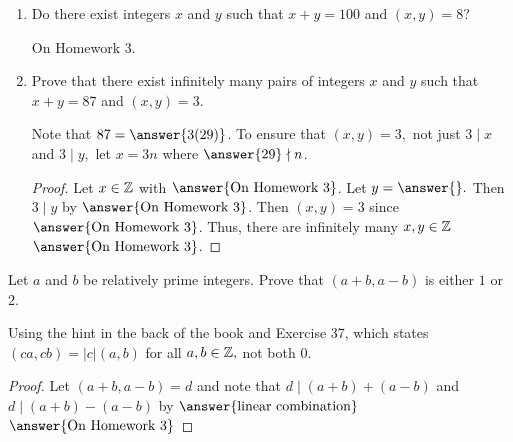 \documentclass[letterpaper, 11 pt]{ximera}
\begin{document}
\begin{br}
    \begin{enumerate}[label=(\alph*)] %
        \item Do there exist integers $x$ and $y$ such that $x + y = 100$ and $(x, y) = 8$?
        
        
        \begin{solution}
            On Homework 3.
        \end{solution}
 
        \item Prove that there exist infinitely many pairs of integers $x$ and $y$ such that $x + y = 87$ and $(x, y) = 3$.
 
        \begin{scratch}
         Note that $87=\answer{3(29)}$.
         To ensure that $(x,y)=3,$ not just $3\mid x$ and $3\mid y,$ let $x=3n$ where $\answer{29}\nmid n$.
        
        \end{scratch}
 
        \begin{proof}
         
         Let $x\in\mathbb Z$ with $\answer{\textnormal{On Homework 3}}$. Let $y= \answer{}.$ Then $3\mid y$ by  $\answer{\textnormal{On Homework 3}}$. Then $(x,y)=3$ since $\answer{\textnormal{On Homework 3}}$. Thus, there are infinitely many $x,y\in\mathbb Z$ $\answer{\textnormal{On Homework 3}}$.
         
        \end{proof}
    
    \end{enumerate}
\end{br}



\begin{br} Let $a$ and $b$ be relatively prime integers. Prove that $(a+b,a-b)$ is either $1$ or $2$.
	

    Using the hint in the back of the book and Exercise 37, which states $(ca,cb)=|c|(a,b)$ for all $a,b\in\mathbb Z,$ not both $0.$ 
\begin{proof}
	Let $(a+b,a-b)=d$ and note that $d\mid (a+b)+(a-b)$ and $d\mid (a+b)-(a-b)$ by $\answer{\textnormal{linear combination}}$
    $\answer{\textnormal{On Homework 3}}$
\end{proof}
\end{br}
\end{document}
